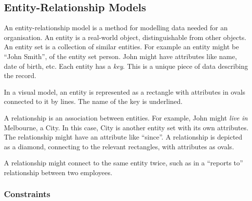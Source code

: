 \documentclass[12pt]{report}
\begin{document}
\begin{flushleft}
\subsection*{Entity-Relationship Models}

An entity-relationship model is a method for modelling data needed for an
organisation. An entity is a real-world object, distinguishable from other
objects. An entity set is a collection of similar entities. For example an
entity might be ``John Smith'', of the entity set person. John might have
attributes like name, date of birth, etc. Each entity has a \textit{key}. This
is a unique piece of data describing the record. \par
In a visual model, an entity is represented as a rectangle with attributes
in ovals connected to it by lines. The name of the key is underlined. \par
A relationship is an association between entities. For example, John might
\textit{live in} Melbourne, a City. In this case, City is another entity set
with its own attributes. The relationship might have an attribute like
``since''. A relationship is depicted as a diamond, connecting to the relevant
rectangles, with attributes as ovals. \par
A relationship might connect to the same entity twice, such as in a ``reports
to'' relationship between two employees.

\subsubsection*{Constraints}


\end{flushleft}
\end{document}
